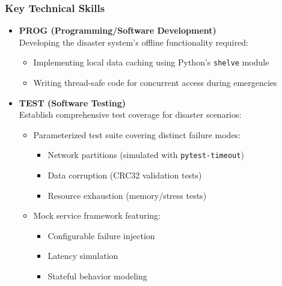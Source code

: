 \documentclass[a4paper, 11pt]{report}
\begin{document}
\subsubsection{Key Technical Skills}
\begin{itemize}
    \item \textbf{PROG (Programming/Software Development)} \\
    Developing the disaster system's offline functionality required:
    \begin{itemize}
        \item Implementing local data caching using Python's \texttt{shelve} module
        \item Writing thread-safe code for concurrent access during emergencies
    \end{itemize}

    \item \textbf{TEST (Software Testing)} \\
    Establish comprehensive test coverage for disaster scenarios:
    \begin{itemize}
        \item Parameterized test suite covering distinct failure modes:
        \begin{itemize}
            \item Network partitions (simulated with \texttt{pytest-timeout})
            \item Data corruption (CRC32 validation tests)
            \item Resource exhaustion (memory/stress tests)
        \end{itemize}

        \item Mock service framework featuring:
        \begin{itemize}
            \item Configurable failure injection 
            \item Latency simulation 
            \item Stateful behavior modeling
        \end{itemize}
    \end{itemize}
\end{itemize}
\end{document}

